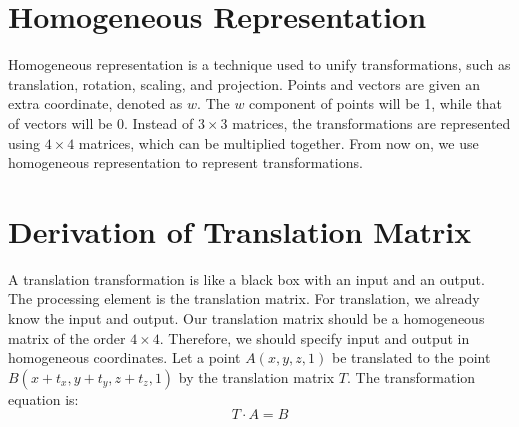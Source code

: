 \section{Homogeneous Representation}
Homogeneous representation is a technique used to unify transformations, such as translation, rotation, scaling, and projection. Points and vectors are given an extra coordinate, denoted as $w$. The $w$ component of points will be 1, while that of vectors will be 0. Instead of $3 \times 3$ matrices, the transformations are represented using $4 \times 4$ matrices, which can be multiplied together. From now on, we use homogeneous representation to represent transformations.
\section{Derivation of Translation Matrix}
A translation transformation is like a black box with an input and an output. The processing element is the translation matrix. For translation, we already know the input and output. Our translation matrix should be a homogeneous matrix of the order $4\times4$. Therefore, we should specify input and output in homogeneous coordinates. Let a point \(A(x, y, z, 1)\) be translated to the point \(B(x+t_x, y+t_y, z+t_z, 1)\) by the translation matrix \(T\).
The transformation equation is: \[T \cdot A = B \]

